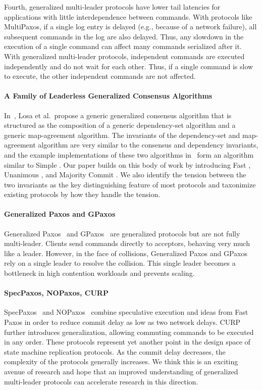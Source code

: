 Fourth, generalized multi-leader protocols have lower tail latencies for
applications with little interdependence between commands. With protocols like
MultiPaxos, if a single log entry is delayed (e.g., because of a network
failure), all subsequent commands in the log are also delayed. Thus, any
slowdown in the execution of a single command can affect many commands
serialized after it. With generalized multi-leader protocols, independent
commands are executed independently and do not wait for each other. Thus, if a
single command is slow to execute, the other independent commands are not
affected.

\paragraph{A Family of Leaderless Generalized Consensus Algorithms}
In~\cite{losa2016brief}, Losa et al.\ propose a generic generalized consensus
algorithm that is structured as the composition of a generic dependency-set
algorithm and a generic map-agreement algorithm. The invariants of the
dependency-set and map-agreement algorithm are very similar to the consensus
and dependency invariants, and the example implementations of these two
algorithms in~\cite{losa2016brief} form an algorithm similar to Simple
\BPaxos{}. Our paper builds on this body of work by introducing Fast \BPaxos{},
Unanimous \BPaxos{}, and Majority Commit \BPaxos{}. We also identify the
tension between the two invariants as the key distinguishing feature of most
protocols and taxonimize existing protocols by how they handle the tension.

\paragraph{Generalized Paxos and GPaxos}
Generalized Paxos~\cite{lamport2005generalized} and GPaxos~\cite{sutra2011fast}
are generalized protocols but are not fully multi-leader. Clients send commands
directly to acceptors, behaving very much like a leader. However, in the face
of collisions, Generalized Paxos and GPaxos rely on a single leader to resolve
the collision. This single leader becomes a bottleneck in high contention
workloads and prevents scaling.

\paragraph{SpecPaxos, NOPaxos, CURP}
SpecPaxos~\cite{ports2015designing} and NOPaxos~\cite{li2016just} combine
speculative execution and ideas from Fast Paxos in order to reduce commit delay
as low as two network delays. CURP~\cite{park2019exploiting} further introduces
generalization, allowing commuting commands to be executed in any order. These
protocols represent yet another point in the design space of state machine
replication protocols. As the commit delay decreases, the complexity of the
protocols generally increases. We think this is an exciting avenue of research
and hope that an improved understanding of generalized multi-leader protocols
can accelerate research in this direction.

